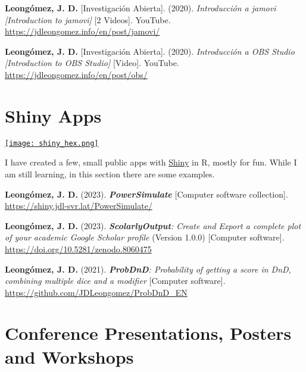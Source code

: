 \documentclass[11pt,a4paper,]{awesome-cv}
\begin{document}
\textbf{Leongómez, J. D.} {[}Investigación Abierta{]}. (2020).
\emph{Introducción a jamovi {[}Introduction to jamovi{]}} {[}2
Videos{]}. YouTube. \url{https://jdleongomez.info/en/post/jamovi/}

\textbf{Leongómez, J. D.} {[}Investigación Abierta{]}. (2020).
\emph{Introducción a OBS Studio {[}Introduction to OBS Studio{]}}
{[}Video{]}. YouTube. \url{https://jdleongomez.info/en/post/obs/}

\endgroup

\hypertarget{shiny-apps}{%
\section{Shiny Apps}\label{shiny-apps}}

\begin{minipage}[c]{0.10\linewidth}
\href{https://jdleongomez.info/en/#shiny}{\texttt{[image: shiny\_hex.png]}}
\end{minipage} \begin{minipage}[c]{0.90\linewidth}
I have created a few, small public apps with \href{https://shiny.posit.co/}{Shiny} in R, mostly for fun. While I am still learning, in this section there are some examples.
\end{minipage}

\begingroup
\footnotesize
\setlength{\parindent}{-0.5in}
\setlength{\leftskip}{0.5in}

\textbf{Leongómez, J. D.} (2023). \textbf{\emph{PowerSimulate}}
{[}Computer software collection{]}.
\url{https://shiny.jdl-svr.lat/PowerSimulate/}

\textbf{Leongómez, J. D.} (2023). \emph{\textbf{ScolarlyOutput}: Create
and Export a complete plot of your academic Google Scholar profile}
(Version 1.0.0) {[}Computer software{]}.
\href{https://github.com/JDLeongomez/ScholarlyOutput}{https://doi.org/10.5281/zenodo.8060475}

\textbf{Leongómez, J. D.} (2021). \emph{\textbf{ProbDnD}: Probability of
getting a score in DnD, combining multiple dice and a modifier}
{[}Computer software{]}. \url{https://github.com/JDLeongomez/ProbDnD_EN}

\endgroup

\hypertarget{conference-presentations-posters-and-workshops}{%
\section{Conference Presentations, Posters and
Workshops}\label{conference-presentations-posters-and-workshops}}
\end{document}
